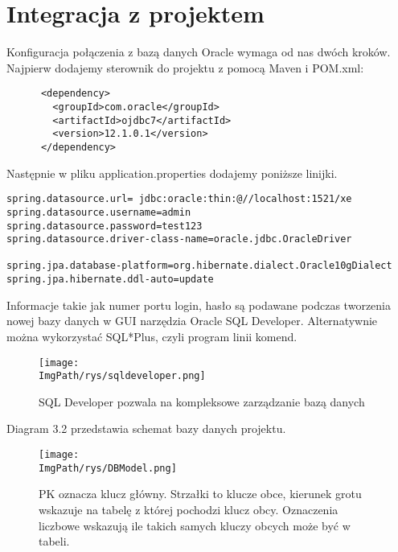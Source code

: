 \documentclass[a4paper,12pt,twoside,openany]{report}
\newcommand{\ImgPath}{.}
\begin{document}
\section{Integracja z projektem}
Konfiguracja połączenia z bazą danych Oracle wymaga od nas dwóch kroków. Najpierw dodajemy sterownik do projektu z pomocą Maven i POM.xml:
\begin{lstlisting}
      <dependency>
        <groupId>com.oracle</groupId>
        <artifactId>ojdbc7</artifactId>
        <version>12.1.0.1</version>
      </dependency>
\end{lstlisting}
Następnie w pliku application.properties dodajemy poniższe linijki.
\begin{lstlisting}
spring.datasource.url= jdbc:oracle:thin:@//localhost:1521/xe
spring.datasource.username=admin
spring.datasource.password=test123
spring.datasource.driver-class-name=oracle.jdbc.OracleDriver

spring.jpa.database-platform=org.hibernate.dialect.Oracle10gDialect
spring.jpa.hibernate.ddl-auto=update
\end{lstlisting}
Informacje takie jak numer portu login, hasło są podawane podczas tworzenia nowej bazy danych w GUI narzędzia Oracle SQL Developer. Alternatywnie można wykorzystać SQL*Plus, czyli program linii komend.
		\begin{figure}[!htbp]
			\begin{center}
				\centering
				\texttt{[image: \\ImgPath/rys/sqldeveloper.png]}
			\end{center}
			\caption{SQL Developer pozwala na kompleksowe zarządzanie bazą danych}
			\label{UMLTS}
		\end{figure}
Diagram 3.2 przedstawia schemat bazy danych projektu.
				\begin{figure}[!htbp]
					\begin{center}
						\centering
						\texttt{[image: \\ImgPath/rys/DBModel.png]}
					\end{center}
					\caption{PK oznacza klucz główny. Strzałki to klucze obce, kierunek grotu wskazuje na tabelę z której pochodzi klucz obcy. Oznaczenia liczbowe wskazują ile takich samych kluczy obcych może być w tabeli.}
					\label{UMLTS}
				\end{figure}		
\end{document}

